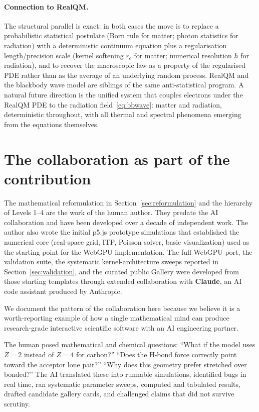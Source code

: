 \documentclass[11pt]{article}
\begin{document}
\paragraph{Connection to RealQM.}
The structural parallel is exact: in both cases the move is to replace a probabilistic statistical postulate (Born rule for matter; photon statistics for radiation) with a deterministic continuum equation plus a regularisation length/precision scale (kernel softening $r_c$ for matter; numerical resolution $h$ for radiation), and to recover the macroscopic law as a property of the regularised PDE rather than as the average of an underlying random process. RealQM and the blackbody wave model are siblings of the same anti-statistical program. A natural future direction is the unified system that couples electrons under the RealQM PDE to the radiation field~\eqref{eq:bbwave}: matter and radiation, deterministic throughout, with all thermal and spectral phenomena emerging from the equations themselves.

\section{The collaboration as part of the contribution}\label{sec:collaboration}

The mathematical reformulation in Section~\ref{sec:reformulation} and the hierarchy of Levels 1--4 are the work of the human author. They predate the AI collaboration and have been developed over a decade of independent work. The author also wrote the initial p5.js prototype simulations that established the numerical core (real-space grid, ITP, Poisson solver, basic visualization) used as the starting point for the WebGPU implementation. The full WebGPU port, the validation suite, the systematic kernel-architecture sweeps reported in Section~\ref{sec:validation}, and the curated public Gallery were developed from those starting templates through extended collaboration with \textbf{Claude}, an AI code assistant produced by Anthropic.

We document the pattern of the collaboration here because we believe it is a worth-reporting example of how a single mathematical mind can produce research-grade interactive scientific software with an AI engineering partner.

The human posed mathematical and chemical questions: ``What if the model uses $Z=2$ instead of $Z=4$ for carbon?'' ``Does the H-bond force correctly point toward the acceptor lone pair?'' ``Why does this geometry prefer stretched over bonded?'' The AI translated these into runnable simulations, identified bugs in real time, ran systematic parameter sweeps, computed and tabulated results, drafted candidate gallery cards, and challenged claims that did not survive scrutiny.
\end{document}

